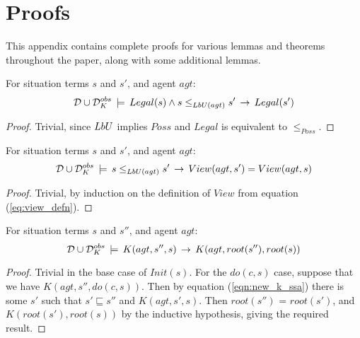 

\chapter{Proofs}

\label{ch:proofs}

This appendix contains complete proofs for various lemmas and theorems
throughout the paper, along with some additional lemmas.

\medskip{}




\begin{lemma}
\label{lem:pbu-implies-legal}For situation terms $s$ and $s'$,
and agent $agt$:\[
\mathcal{D}\cup\mathcal{D}_{K}^{obs}\,\models\, Legal(s)\wedge s\leq_{LbU(agt)}s'\,\rightarrow\, Legal(s')\]

\end{lemma}
\begin{proof}
Trivial, since $LbU$ implies $Poss$ and $Legal$ is equivalent
to $\leq_{Poss}$.
\end{proof}
\medskip{}


\begin{lemma}
\label{lem:pbu-implies-view}For situation terms $s$ and $s'$, and
agent $agt$:\[
\mathcal{D}\cup\mathcal{D}_{K}^{obs}\,\models\, s\leq_{LbU(agt)}s'\,\rightarrow\, View(agt,s')=View(agt,s)\]

\end{lemma}
\begin{proof}
Trivial, by induction on the definition of $View$ from equation (\ref{eq:view_defn}).
\end{proof}
\medskip{}


\begin{lemma}
\label{lem:K-implies-root}For situation terms $s$ and $s''$, and
agent $agt$:\[
\mathcal{D}\cup\mathcal{D}_{K}^{obs}\,\models\, K(agt,s'',s)\,\rightarrow\, K(agt,root(s''),root(s))\]

\end{lemma}
\begin{proof}
Trivial in the base case of $Init(s)$. For the $do(c,s)$ case, suppose
that we have $K(agt,s'',do(c,s))$. Then by equation (\ref{eqn:new_k_ssa})
there is some $s'$ such that $s'\sqsubseteq s''$ and $K(agt,s',s)$.
Then $root(s'')$ = $root(s')$, and $K(root(s'),root(s))$ by the
inductive hypothesis, giving the required result.
\end{proof}
\medskip{}


